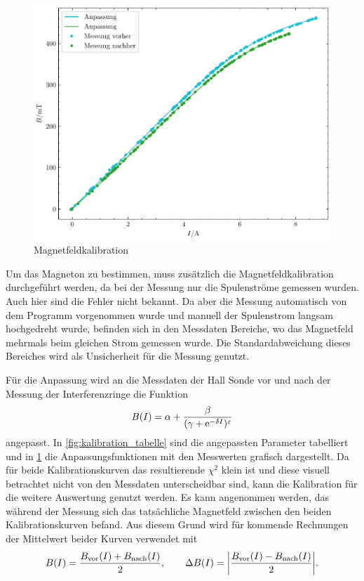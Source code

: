 \begin{figure}[htb]
    \centering
    \includegraphics[width=.6\linewidth]{../figs/BFeld-Kalibrationskurve}
    \caption{Magnetfeldkalibration}
    \label{fig:bfield_kalibration}
\end{figure}

Um das Magneton zu bestimmen, muss zusätzlich die Magnetfeldkalibration durchgeführt werden, da 
bei der Messung nur die Spulenströme gemessen wurden. Auch hier sind die Fehler nicht bekannt. 
Da aber die Messung automatisch von dem Programm vorgenommen wurde und manuell der Spulenstrom 
langsam hochgedreht wurde, befinden sich in den Messdaten Bereiche, wo das Magnetfeld
mehrmals beim gleichen Strom gemessen wurde. Die Standardabweichung dieses Bereiches 
wird als Unsicherheit für die Messung genutzt.


Für die Anpassung wird an die Messdaten der Hall Sonde vor und nach der Messung der Interferenzringe 
die Funktion 
\begin{equation*}
    B(I) = \alpha + \frac{\beta}{(\gamma + \mathrm e^{-\delta I})^\varepsilon}
\end{equation*}
angepasst. In \cref{fig:kalibration_tabelle} sind die angepassten Parameter tabelliert 
und in \cref{fig:bfield_kalibration} die Anpassungsfunktionen mit den Messwerten 
grafisch dargestellt. Da für beide Kalibrationskurven das resultierende $\chi^2$
klein ist und diese visuell betrachtet nicht von den Messdaten unterscheidbar sind,
kann die Kalibration für die weitere Auswertung genutzt werden. Es kann angenommen werden,
das während der Messung sich das tatsächliche Magnetfeld zwischen den beiden Kalibrationskurven
befand. Aus diesem Grund wird für kommende Rechnungen der Mittelwert beider 
Kurven verwendet mit 
\[B(I) = \frac{B_\mathrm{vor}(I) + B_\mathrm{nach}(I)}{2}, 
\qquad \Delta B(I) = \abs{\frac{B_\mathrm{vor}(I) - B_\mathrm{nach}(I)}{2}}.\]



